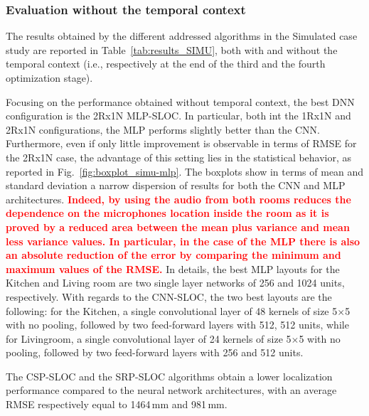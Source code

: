 \documentclass[review]{elsarticle}
\newcommand{\figref}[1]{Fig.~\ref{#1}}
\newcommand{\tableref}[1]{Table~\ref{#1}}
\begin{document}
\subsubsection{Evaluation without the temporal context}
The results obtained by the different addressed algorithms in the Simulated case study are reported in \tableref{tab:results_SIMU}, both with and without the temporal context (i.e., respectively at the end of the third and the fourth optimization stage).

Focusing on the performance obtained without temporal context, the best DNN configuration is the 2Rx1N MLP-SLOC. In particular, both int the 1Rx1N and  2Rx1N configurations, the MLP performs slightly better than the CNN. 
Furthermore, even if only little improvement is observable in terms of RMSE for the 2Rx1N case, the advantage of this setting lies in the statistical behavior, as reported in \figref{fig:boxplot_simu-mlp}. 
The boxplots show in terms of mean and standard deviation a narrow dispersion of results for both the CNN and MLP architectures.
\textcolor{red}{\textbf{Indeed, by using the audio from both rooms reduces the dependence on the microphones location inside the room as it is proved by a reduced area between the mean plus variance and mean less variance values. In particular, in the case of the MLP there is also an absolute reduction of the error by comparing the minimum and maximum values of the RMSE.}}
In details, the best MLP layouts for the Kitchen and Living room are two single layer networks of 256 and 1024 units, respectively. %
With regards to the CNN-SLOC, the two best layouts are the following: for the Kitchen, a single convolutional layer of 48 kernels of size 5$\times$5 with no pooling, followed by two feed-forward layers with 512, 512 units, while for Livingroom, a single convolutional layer of 24 kernels of size 5$\times$5 with no pooling, followed by two feed-forward layers with 256 and 512 units.

The CSP-SLOC and the SRP-SLOC algorithms obtain a lower localization performance compared to the neural network architectures, with an average RMSE respectively equal to 1464\,mm and 981\,mm.
\end{document}
